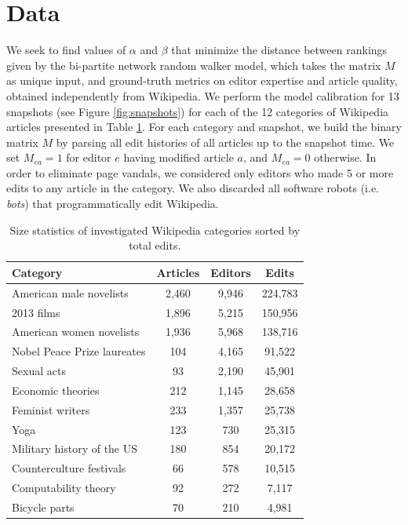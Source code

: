 \section{Data}

We seek to find values of $\alpha$ and $\beta$ that minimize the distance between rankings given by the bi-partite network random walker model, which takes the matrix $M$ as unique input, and ground-truth metrics on editor expertise and article quality, obtained independently from Wikipedia. We perform the model calibration for 13 snapshots (see Figure \ref{fig:snapshots})  for each of  the 12 categories of Wikipedia articles presented in Table \nolinebreak \ref{tab:statistics}. For each category and snapshot, we build the binary matrix $M$ by parsing all edit histories of all articles up to the snapshot time. We set $M_{ea} = 1$ for editor $e$ having modified article $a$, and $M_{ea} = 0$ otherwise. In order to eliminate page vandals, we considered only editors who made 5 or more edits to any article in the category. We also discarded all software robots (i.e. {\it bots}) that programmatically edit Wikipedia. 

\begin{table}
\begin{tabular}{|l|c|c|c|}
\hline
{\bf Category} &  {\bf Articles} &  {\bf Editors} &  {\bf Edits} \\
\hline
American male novelists               &      2,460 &   9,946 &  224,783 \\
2013 films                            &      1,896 &   5,215 &  150,956 \\
American women novelists              &      1,936 &   5,968 &  138,716 \\
Nobel Peace Prize laureates           &       104 &   4,165 &   91,522 \\
Sexual acts                           &        93 &   2,190 &   45,901 \\
Economic theories                     &       212 &   1,145 &   28,658 \\
Feminist writers                      &       233 &   1,357 &   25,738 \\
Yoga                                  &       123 &    730 &   25,315 \\
Military history of the US &       180 &    854 &   20,172 \\
Counterculture festivals              &        66 &    578 &   10,515 \\
Computability theory                  &        92 &    272 &    7,117 \\
Bicycle parts                         &        70 &    210 &    4,981 \\
\hline
\end{tabular}
\caption{Size statistics of investigated Wikipedia categories sorted by total edits.}
\label{tab:statistics}
\end{table}

